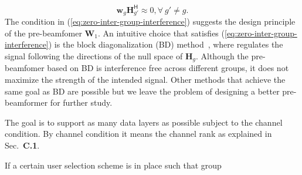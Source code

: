 \documentclass[a4paper,12pt]{article}%
\begin{document}
\begin{equation}\label{eq:zero-inter-group-interference}
\mathbf{w}_g \mathbf{H}_{g'}^\mathsf{H} \approx 0, \forall~g' \neq g.
\end{equation}
The condition in (\ref{eq:zero-inter-group-interference}) suggests the design principle of the pre-beamfomer $\mathbf{W}_1$. An intuitive choice that satisfies (\ref{eq:zero-inter-group-interference}) is the block diagonalization (BD) method~\cite{Cho2010}, where regulates the signal following the directions of the null space of $\mathbf{H}_g$. Although the pre-beamfomer based on BD is interference free across different groups, it does not maximize the strength of the intended signal. Other methods that achieve the same goal as BD are possible but we leave the problem of designing a better pre-beamformer for further study.


The goal is to support as many data layers as possible subject to the channel condition. By channel condition it means the channel rank as explained in Sec.~\textbf{C.1}. 


If a certain user selection scheme is in place such that group  






\end{document}
